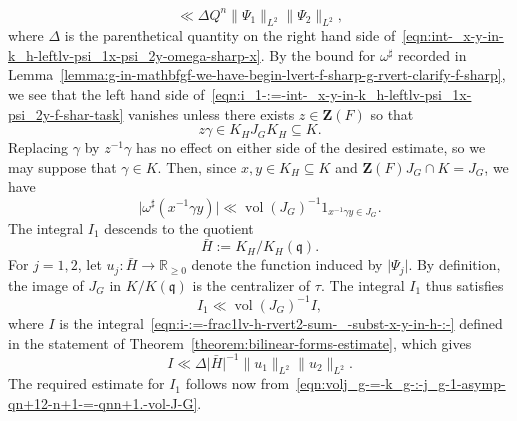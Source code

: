 \documentclass[reqno]{amsart}
\DeclareMathOperator{\vol}{vol}
\theoremstyle{plain} \newtheorem{theorem} {Theorem} \newtheorem{conjecture} {Conjecture} \newtheorem{corollary} [theorem] {Corollary} \newtheorem{proposition} [theorem] {Proposition} \newtheorem{fact} [theorem] {Fact}
\theoremstyle{definition} \newtheorem{definition} [theorem] {Definition}
\theoremstyle{itplain} %
\newcommand{\mfq}{\mathfrak{q}}
\begin{document}
\begin{enumerate}[(i)]
\begin{equation}
    \ll \Delta Q^n \lVert \Psi_1 \rVert_{L^2} \lVert \Psi_2 \rVert_{L^2},
  \end{equation}
  where $\Delta$ is the parenthetical quantity on the right hand side of~\eqref{eqn:int-_x-y-in-k_h-leftlv-psi_1x-psi_2y-omega-sharp-x}.  By the bound for $\omega ^\sharp$ recorded in Lemma~\ref{lemma:g-in-mathbfgf-we-have-begin-lvert-f-sharp-g-rvert-clarify-f-sharp}, we see that the left hand side of~\eqref{eqn:i_1-:=-int-_x-y-in-k_h-leftlv-psi_1x-psi_2y-f-shar-task} vanishes unless there exists $z \in \mathbf{Z}(F)$ so that
  \begin{equation*}
    z \gamma \in K_H J_G K_H \subseteq K.
  \end{equation*}
  Replacing $\gamma$ by $z^{-1} \gamma$ has no effect on either side of the desired estimate, so we may suppose that $\gamma \in K$.  Then, since $x,y \in K_H \subseteq K$ and $\mathbf{Z}(F) J_G \cap K = J_G$, we have
  \begin{equation*}
    \lvert \omega ^\sharp (x ^{-1} \gamma y) \rvert \ll {\vol(J_G)}^{-1} 1 _{x ^{-1} \gamma y \in J_G}.
  \end{equation*}
  The integral $I_1$ descends to the quotient
  \begin{equation*}
    \bar{H} := K_H / K_H(\mfq).
  \end{equation*}
  For $j=1,2$, let $u_j : \bar{H} \rightarrow \mathbb{R}_{\geq 0}$ denote the function induced by $\lvert \Psi_j \rvert$.  By definition, the image of $J_G$ in $K / K(\mfq)$ is the centralizer of $\tau$.  The integral $I_1$ thus satisfies
  \begin{equation*}
    I_1 \ll {\vol(J_G)}^{-1} I,
  \end{equation*}
  where $I$ is the integral~\eqref{eqn:i-:=-frac1lv-h-rvert2-sum-_-subst-x-y-in-h-:-} defined in the statement of Theorem~\ref{theorem:bilinear-forms-estimate}, which gives
  \begin{equation*}
    I \ll \Delta \lvert \bar{H} \rvert^{-1} \lVert u_1 \rVert _{L^2} \lVert u_2 \rVert_{L^2}.
  \end{equation*}
  The required estimate for $I_1$ follows now from~\eqref{eqn:volj_g-=-k_g-:-j_g-1-asymp-qn+12-n+1-=-qnn+1.-vol-J-G}.
\end{enumerate}
\end{document}

